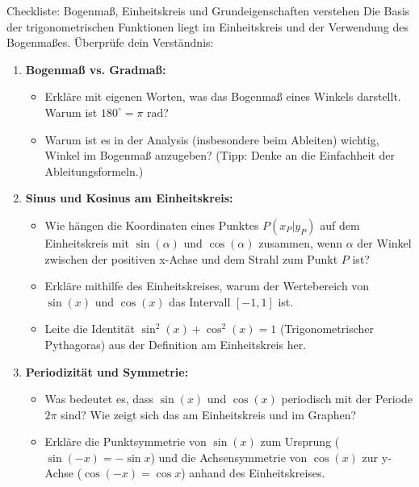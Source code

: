 \begin{aufgabenumgebung}{Checkliste: Bogenmaß, Einheitskreis und Grundeigenschaften verstehen}
Die Basis der trigonometrischen Funktionen liegt im Einheitskreis und der Verwendung des Bogenmaßes. Überprüfe dein Verständnis:

\begin{enumerate}[label=(\alph*)]
    \item \textbf{Bogenmaß vs. Gradmaß:}
    \begin{itemize}
        \item Erkläre mit eigenen Worten, was das Bogenmaß eines Winkels darstellt. Warum ist $180^\circ = \pi \text{ rad}$?
        \item Warum ist es in der Analysis (insbesondere beim Ableiten) wichtig, Winkel im Bogenmaß anzugeben? (Tipp: Denke an die Einfachheit der Ableitungsformeln.)
    \end{itemize}
    \item \textbf{Sinus und Kosinus am Einheitskreis:}
    \begin{itemize}
        \item Wie hängen die Koordinaten eines Punktes $P(x_P|y_P)$ auf dem Einheitskreis mit $\sin(\alpha)$ und $\cos(\alpha)$ zusammen, wenn $\alpha$ der Winkel zwischen der positiven x-Achse und dem Strahl zum Punkt $P$ ist?
        \item Erkläre mithilfe des Einheitskreises, warum der Wertebereich von $\sin(x)$ und $\cos(x)$ das Intervall $[-1, 1]$ ist.
        \item Leite die Identität $\sin^2(x) + \cos^2(x) = 1$ (Trigonometrischer Pythagoras) aus der Definition am Einheitskreis her.
    \end{itemize}
    \item \textbf{Periodizität und Symmetrie:}
    \begin{itemize}
        \item Was bedeutet es, dass $\sin(x)$ und $\cos(x)$ periodisch mit der Periode $2\pi$ sind? Wie zeigt sich das am Einheitskreis und im Graphen?
        \item Erkläre die Punktsymmetrie von $\sin(x)$ zum Ursprung ($\sin(-x)=-\sin x$) und die Achsensymmetrie von $\cos(x)$ zur y-Achse ($\cos(-x)=\cos x$) anhand des Einheitskreises.
    \end{itemize}
\end{enumerate}
\end{aufgabenumgebung}



